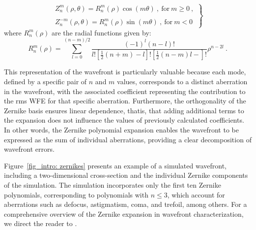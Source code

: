 \begin{equation}
  \left.
  \begin{array}{l}
  Z _ n ^m (\rho, \theta) = R _ n ^m (\rho) \cos (m\theta)\ , \ \text{for} \ m \geqslant 0 \ ,\\
  \\
  Z _ n ^{-m} (\rho, \theta) = R _ n ^m (\rho) \sin (m\theta) \ , \ \text{for}  \ m < 0 \ 
  \end{array}
  \right\}
\end{equation}
where $R _ n ^m (\rho)$ are the radial functions given by:
\begin{equation}
  R_n^m(\rho)=\sum_{l=0}^{(n-m) / 2} \frac{(-1)^l(n-l)!}{l!\left[\frac{1}{2}(n+m)-l\right]!\left[\frac{1}{2}(n-m)l-\right]!}\rho ^{n - 2l} \ .
\end{equation}

This representation of the wavefront is particularly valuable because each mode, defined by a specific pair of $n$ and $m$ values, corresponds to a distinct aberration in the wavefront, with the associated coefficient representing the contribution to the rms WFE for that specific aberration. Furthermore, the orthogonality of the Zernike basis ensures linear dependence, thatis, that adding additional terms to the expansion does not influence the values of previously calculated coefficients. In other words, the Zernike polynomial expansion enables the wavefront to be expressed as the sum of individual aberrations, providing a clear decomposition of wavefront errors.

Figure~\ref{fig_intro: zernikes} presents an example of a simulated wavefront, including a two-dimensional cross-section and the individual Zernike components of the simulation. The simulation incorporates only the first ten Zernike polynomials, corresponding to polynomials with $n \leqslant 3$, which account for aberrations such as defocus, astigmatism, coma, and trefoil, among others. For a comprehensive overview of the Zernike expansion in wavefront characterization, we direct the reader to \citet{Zernike_guide}.

